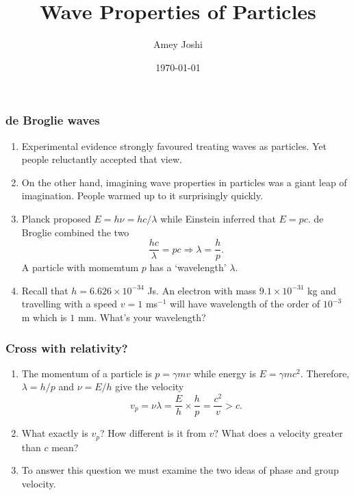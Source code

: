 \documentclass{beamer}
\title{Wave Properties of Particles}
\author{Amey Joshi}
\date{\today}
\begin{document}
\begin{frame}
\titlepage
\end{frame}

\begin{frame}
\frametitle{de Broglie waves}
\begin{enumerate}
\item Experimental evidence strongly favoured treating waves as particles. Yet
people reluctantly accepted that view.
\item On the other hand, imagining wave properties in particles was a giant leap
of imagination. People warmed up to it surprisingly quickly.
\item Planck proposed $E = h\nu = hc/\lambda$ while Einstein inferred that 
$E=pc$. de Broglie combined the two
\begin{equation}\label{e1}
\frac{hc}{\lambda} = pc \Rightarrow \lambda = \frac{h}{p}.
\end{equation}
A particle with momemtum $p$ has a `wavelength' $\lambda$.
\item Recall that $h = 6.626 \times 10^{-34}$ Js. An electron with mass $9.1
\times 10^{-31}$ kg and travelling with a speed $v = 1$ ms${}^{-1}$ will have
wavelength of the order of $10^{-3}$ m which is $1$ mm. What's your wavelength?
\end{enumerate}
\end{frame}

\begin{frame}
\frametitle{Cross with relativity?}
\begin{enumerate}
\item The momentum of a particle is $p = \gamma mv$ while energy is $E = \gamma
mc^2$. Therefore, $\lambda = h/p$ and $\nu = E/h$ give the velocity
\begin{equation}\label{e2}
v_p = \nu\lambda = \frac{E}{h}\times\frac{h}{p} = \frac{c^2}{v} > c.
\end{equation}
\item What exactly is $v_p$? How different is it from $v$? What does a velocity
greater than $c$ mean?
\item To answer this question we must examine the two ideas of phase and group
velocity.
\end{enumerate}
\end{frame}
\end{document}
